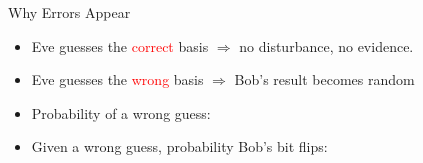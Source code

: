 \documentclass[aspectratio=169]{beamer}
\begin{document}
\begin{frame}{Why Errors Appear}
\begin{itemize}
  \item<1-> Eve guesses the \textcolor{red}{correct} basis $\Rightarrow$ no disturbance, no evidence.
  \item<2-> Eve guesses the \textcolor{red}{wrong} basis $\Rightarrow$ Bob's result becomes random
  \item<3-> Probability of a wrong guess: \textonehalf
  \item<4-> Given a wrong guess, probability Bob's bit flips: \textonehalf
\end{itemize}
\vspace{0.35cm}
\vspace{0.25cm}
\end{frame}
\end{document}
